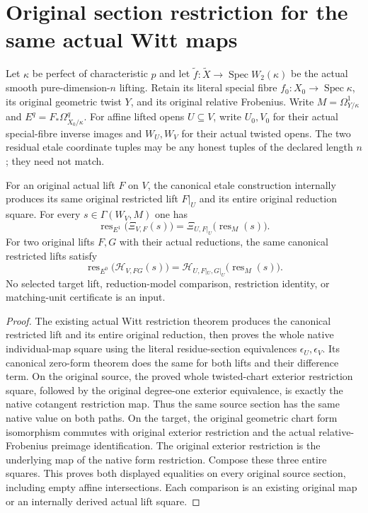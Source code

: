 \section{Original section restriction for the same actual Witt maps}

Let $\kappa$ be perfect of characteristic $p$ and let $\widetilde f:\widetilde X\to\operatorname{Spec}W_2(\kappa)$ be the actual smooth pure-dimension-$n$ lifting. Retain its literal special fibre $f_0:X_0\to\operatorname{Spec}\kappa$, its original geometric twist $Y$, and its original relative Frobenius. Write $M=\Omega^1_{Y/\kappa}$ and $E^q=F_*\Omega^q_{X_0/\kappa}$. For affine lifted opens $U\subseteq V$, write $U_0,V_0$ for their actual special-fibre inverse images and $W_U,W_V$ for their actual twisted opens. The two residual etale coordinate tuples may be any honest tuples of the declared length $n$; they need not match.

\begin{theorem}
\label{thm:actual-witt-geometric-section-restrictions}
\leanok
For an original actual lift $F$ on $V$, the canonical etale construction internally produces its same original restricted lift $F|_U$ and its entire original reduction square. For every $s\in\Gamma(W_V,M)$ one has
\[
 \operatorname{res}_{E^1}\bigl(\Xi_{V,F}(s)\bigr)
   =\Xi_{U,F|_U}\bigl(\operatorname{res}_M(s)\bigr).
\]
For two original lifts $F,G$ with their actual reductions, the same canonical restricted lifts satisfy
\[
 \operatorname{res}_{E^0}\bigl(\mathcal H_{V,FG}(s)\bigr)
   =\mathcal H_{U,F|_U,G|_U}\bigl(\operatorname{res}_M(s)\bigr).
\]
No selected target lift, reduction-model comparison, restriction identity, or matching-unit certificate is an input.
\end{theorem}
\begin{proof}
The existing actual Witt restriction theorem produces the canonical restricted lift and its entire original reduction, then proves the whole native individual-map square using the literal residue-section equivalences $\epsilon_U,\epsilon_V$. Its canonical zero-form theorem does the same for both lifts and their difference term. On the original source, the proved whole twisted-chart exterior restriction square, followed by the original degree-one exterior equivalence, is exactly the native cotangent restriction map. Thus the same source section has the same native value on both paths. On the target, the original geometric chart form isomorphism commutes with original exterior restriction and the actual relative-Frobenius preimage identification. The original exterior restriction is the underlying map of the native form restriction. Compose these three entire squares. This proves both displayed equalities on every original source section, including empty affine intersections. Each comparison is an existing original map or an internally derived actual lift square.
\end{proof}
